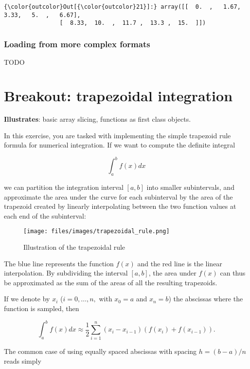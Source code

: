 \documentclass{article}
\begin{document}
            \begin{Verbatim}[commandchars=\\\{\}]
{\color{outcolor}Out[{\color{outcolor}21}]:} array([[  0.  ,   1.67,   3.33,   5.  ,   6.67],
                [  8.33,  10.  ,  11.7 ,  13.3 ,  15.  ]])
\end{Verbatim}
        
    \subsubsection{Loading from more complex formats}

TODO

    \section{Breakout: trapezoidal integration}

\textbf{Illustrates}: basic array slicing, functions as first class
objects.

In this exercise, you are tasked with implementing the simple trapezoid
rule formula for numerical integration. If we want to compute the
definite integral

\[
     \int_{a}^{b}f(x)dx
\]

we can partition the integration interval $[a,b]$ into smaller
subintervals, and approximate the area under the curve for each
subinterval by the area of the trapezoid created by linearly
interpolating between the two function values at each end of the
subinterval:

\begin{figure}[htbp]
\centering
\texttt{[image: files/images/trapezoidal\_rule.png]}
\caption{Illustration of the trapezoidal rule}
\end{figure}

The blue line represents the function $f(x)$ and the red line is the
linear interpolation. By subdividing the interval $[a,b]$, the area
under $f(x)$ can thus be approximated as the sum of the areas of all the
resulting trapezoids.

If we denote by $x_{i}$ ($i=0,\ldots,n,$ with $x_{0}=a$ and $x_{n}=b$)
the abscissas where the function is sampled, then

\[
   \int_{a}^{b}f(x)dx\approx\frac{1}{2}\sum_{i=1}^{n}\left(x_{i}-x_{i-1}\right)\left(f(x_{i})+f(x_{i-1})\right).
\]

The common case of using equally spaced abscissas with spacing
$h=(b-a)/n$ reads simply
\end{document}
